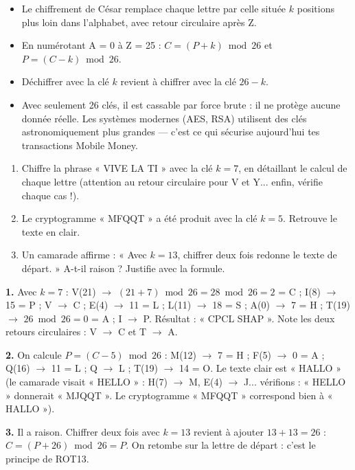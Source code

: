 \documentclass[11pt]{article}
\begin{document}
\begin{aretenir}
\begin{itemize}
  \item Le chiffrement de César remplace chaque lettre par celle située $k$ positions plus loin dans l'alphabet, avec retour circulaire après Z.
  \item En numérotant A = 0 à Z = 25 : $C = (P + k) \bmod 26$ et $P = (C - k) \bmod 26$.
  \item Déchiffrer avec la clé $k$ revient à chiffrer avec la clé $26 - k$.
  \item Avec seulement 26 clés, il est cassable par force brute : il ne protège aucune donnée réelle. Les systèmes modernes (AES, RSA) utilisent des clés astronomiquement plus grandes — c'est ce qui sécurise aujourd'hui tes transactions Mobile Money.
\end{itemize}
\end{aretenir}

\begin{exercice}
\begin{enumerate}
  \item Chiffre la phrase « VIVE LA TI » avec la clé $k = 7$, en détaillant le calcul de chaque lettre (attention au retour circulaire pour V et Y... enfin, vérifie chaque cas !).
  \item Le cryptogramme « MFQQT » a été produit avec la clé $k = 5$. Retrouve le texte en clair.
  \item Un camarade affirme : « Avec $k = 13$, chiffrer deux fois redonne le texte de départ. » A-t-il raison ? Justifie avec la formule.
\end{enumerate}
\end{exercice}

\begin{corrige}[Exercice]
\textbf{1.} Avec $k = 7$ : V(21) $\rightarrow$ $(21+7) \bmod 26 = 28 \bmod 26 = 2$ = C ; I(8) $\rightarrow$ 15 = P ; V $\rightarrow$ C ; E(4) $\rightarrow$ 11 = L ; L(11) $\rightarrow$ 18 = S ; A(0) $\rightarrow$ 7 = H ; T(19) $\rightarrow$ $26 \bmod 26 = 0$ = A ; I $\rightarrow$ P. Résultat : « CPCL SHAP ». Note les deux retours circulaires : V $\rightarrow$ C et T $\rightarrow$ A.

\textbf{2.} On calcule $P = (C - 5) \bmod 26$ : M(12) $\rightarrow$ 7 = H ; F(5) $\rightarrow$ 0 = A ; Q(16) $\rightarrow$ 11 = L ; Q $\rightarrow$ L ; T(19) $\rightarrow$ 14 = O. Le texte clair est « HALLO » (le camarade visait « HELLO » : H(7) $\rightarrow$ M, E(4) $\rightarrow$ J... vérifions : « HELLO » donnerait « MJQQT ». Le cryptogramme « MFQQT » correspond bien à « HALLO »).

\textbf{3.} Il a raison. Chiffrer deux fois avec $k = 13$ revient à ajouter $13 + 13 = 26$ : $C = (P + 26) \bmod 26 = P$. On retombe sur la lettre de départ : c'est le principe de ROT13.
\end{corrige}
\end{document}
